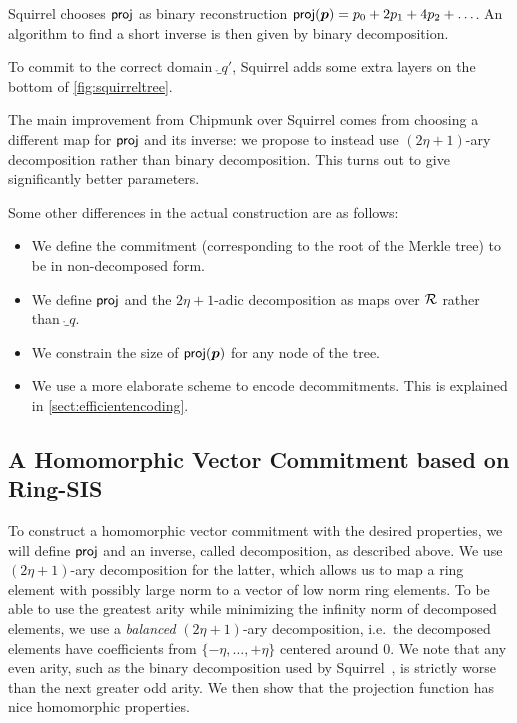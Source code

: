 Squirrel chooses $\mathsf{proj}$ as binary reconstruction $\mathsf{proj}(\boldsymbol{p}) = p_0 + 2p_1 + 4p_2 + \ldots$.
An algorithm to find a short inverse is then given by binary decomposition.

To commit to the correct domain $\ring_{q'}$, Squirrel adds some extra layers on the bottom of \autoref{fig:squirreltree}.

The main improvement from Chipmunk over Squirrel comes from choosing a different map for $\mathsf{proj}$ and its inverse: we propose to instead use $(2\eta+1)$-ary decomposition rather than binary decomposition.
This turns out to give significantly better parameters.

Some other differences in the actual construction are as follows:
\begin{itemize}
 \item We define the commitment (corresponding to the root of the Merkle tree) to be in non-decomposed form.
 \item We define $\mathsf{proj}$ and the $2\eta+1$-adic decomposition as maps over $\mathcal{R}$ rather than $\ring_q$.
 \item We constrain the size of $\mathsf{proj}(\boldsymbol{p})$ for any node of the tree.
 \item We use a more elaborate scheme to encode decommitments. This is explained in \autoref{sect:efficientencoding}.
\end{itemize}

\subsection{A Homomorphic Vector Commitment based on Ring-SIS}\label{sec:our_hvc_construction}
To construct a homomorphic vector commitment with the desired properties, we will define $\mathsf{proj}$ and an inverse, called decomposition, as described above.
We use $(2\eta+1)$-ary decomposition for the latter, which allows us to map a ring element with possibly large norm to a vector of low norm ring elements.
To be able to use the greatest arity while minimizing the infinity norm of decomposed elements, we use a \emph{balanced} $(2\eta+1)$-ary decomposition, i.e.\ the decomposed elements have coefficients from $\{-\eta,\ldots,+\eta\}$ centered around 0.
We note that any even arity, such as the binary decomposition used by Squirrel~\cite{CCS:FleSimZha22}, is strictly worse than the next greater odd arity.
We then show that the projection function has nice homomorphic properties.


